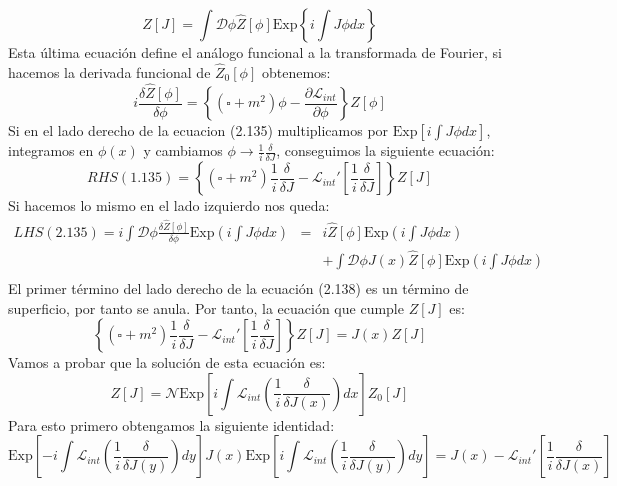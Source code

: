 \begin{equation}
Z[J]=\int\mathcal{D}\phi\hat{Z}[\phi]\text{Exp}\left\{ i\int J\phi dx\right\}
\end{equation}
Esta última ecuación define el análogo funcional a la transformada de Fourier, si hacemos la derivada funcional de $\hat{Z}_0[\phi]$ obtenemos:
\begin{equation}
i\frac{\delta\hat{Z}[\phi]}{\delta\phi}=\left\{ (\square+m^{2})\phi-\frac{\partial\mathcal{L}_{int}}{\partial\phi}\right\} \hat{Z}[\phi]
\end{equation}
Si en el lado derecho de la ecuacion (2.135) multiplicamos por $\text{Exp}[i\int J\phi dx]$, integramos en $\phi(x)$ y cambiamos $\phi \rightarrow \frac{1}{i}\frac{\delta}{\delta J}$, conseguimos la siguiente ecuación:
\begin{equation}
RHS(1.135)=\left\{ (\square +m^{2})\frac{1}{i}\frac{\delta}{\delta J}-\mathcal{L}_{int}\prime\left[\frac{1}{i}\frac{\delta}{\delta J}\right]\right\} Z[J]
\end{equation} 
Si hacemos lo mismo en el lado izquierdo nos queda:
\begin{eqnarray}
\nonumber LHS(2.135)=i\int\mathcal{D}\phi\frac{\delta\hat{Z}[\phi]}{\delta\phi}\text{Exp}\left(i\int J\phi dx\right)&=& i\hat{Z}[\phi]\text{Exp}\left(i\int J\phi dx\right)\\
\nonumber &&+\int\mathcal{D}\phi J(x)\hat{Z}[\phi]\text{Exp}\left(i\int J\phi dx\right)\\
\end{eqnarray}
El primer término del lado derecho de la ecuación (2.138) es un término de superficio, por tanto se anula. Por tanto, la ecuación que cumple $Z[J]$ es:
\begin{equation}
\left\{ (\square+m^{2})\frac{1}{i}\frac{\delta}{\delta J}-\mathcal{L}_{int}\prime\left[\frac{1}{i}\frac{\delta}{\delta J}\right]\right\} Z[J]=J(x)Z[J]
\end{equation}
Vamos a probar que la solución de esta ecuación es:
\begin{equation}
Z[J]=\mathcal{N}\text{Exp}\left[i\int\mathcal{L}_{int}\left(\frac{1}{i}\frac{\delta}{\delta J(x)}\right)dx\right]Z_{0}[J]
\end{equation} 
Para esto primero obtengamos la siguiente identidad:
\begin{equation}
\text{Exp}\left[-i\int\mathcal{L}_{int}\left(\frac{1}{i}\frac{\delta}{\delta J(y)}\right)dy\right]J(x)\text{Exp}\left[i\int\mathcal{L}_{int}\left(\frac{1}{i}\frac{\delta}{\delta J(y)}\right)dy\right]=J(x)-\mathcal{L}_{int}\prime\left[\frac{1}{i}\frac{\delta}{\delta J(x)}\right]
\end{equation}
